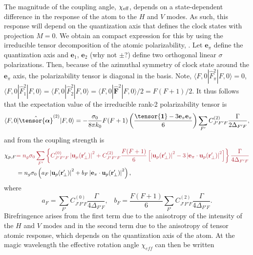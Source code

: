 \documentclass[preprint,aps,pra,onecolumn]{revtex4-1} %
\newcommand{\comment}[1]{{\color{Maroon} #1}}
\begin{document}
The magnitude of the coupling angle, $\chi_{\text{eff}}$, depends on a state-dependent difference in the response of the atom to the $H$ and $V$ modes.  As such, this response will depend on the quantization axis that defines the clock states with projection $M=0$.  We obtain an compact expression for this by using the irreducible tensor decomposition of the atomic polarizability, .  Let $\mathbf{e}_\pi$ define the quantization axis and $\mathbf{e}_{1}$, $\mathbf{e}_{2}$ \comment{(why not $\pm$?)} define two orthogonal linear $\sigma$ polarizations.  Then, because of the azimuthal symmetry of clock state around the $\mathbf{e}_\pi$ axis, the polarizability tensor is diagonal in the basis.  Note, $\langle F,0 | \hat{F}_{\pi}^2| F,0 \rangle =0$, $\langle F,0 | \hat{F}_{1}^2| F,0 \rangle = \langle F,0 | \hat{F}_{2}^2| F,0 \rangle = \langle F,0 | \hat{\mathbf{F}}^2| F,0 \rangle /2 =F(F+1)/2$.  It thus follows that the expectation value of the  irreducible rank-2 polarizability tensor is
\comment{
\begin{equation}
\langle F,0 | \hat{\tensor{\boldsymbol{\alpha}}}^{(2)}| F,0 \rangle  = -\frac{\sigma_0}{8\pi k_0} F(F+1) \left( \frac{\tensor{\boldsymbol{1}} - 3\mathbf{e}_\pi \mathbf{e}_\pi}{6}  \right) \sum_{F'} C^{(2)}_{J'F'F} \frac{\Gamma}{ 2 \Delta_{F'F}},
\end{equation}
}
and from  the coupling strength is
\begin{align}
\chi_{p,F} & \comment{ = n_g \sigma_0 \sum_{F'}  \left\{C^{(0)}_{J'F'F}\left|\mathbf{u}_\mu(\br'_\perp)\right|^2+ C^{(2)}_{J'F'F} \frac{F(F+1)}{6}\left[\left|\mathbf{u}_p(\br'_\perp)\right|^2- 3 \left|\mathbf{e}_\pi \cdot \mathbf{u}_p(\br'_\perp)\right|^2 \right]\right\}   \frac{\Gamma}{4 \Delta_{F'F}} \nonumber } \\
&  = n_g \sigma_0\left(  a_{F} \left|\mathbf{u}_p(\br'_\perp)\right|^2 + b_{F} \left|\mathbf{e}_\pi \cdot \mathbf{u}_p(\br'_\perp)\right|^2 \right),
\end{align}
where
\begin{equation}
a_F = \sum_{F'}  C^{(0)}_{J'F'F} \frac{\Gamma}{4 \Delta_{F'F}},\; \;\; b_F = \frac{F(F+1)}{6}\sum_{F'} C^{(2)}_{J'F'F}  \frac{\Gamma}{4 \Delta_{F'F}}.
\end{equation}
Birefringence arises from the first term due to the anisotropy of the intensity of the $H$ and $V$ modes and in the second term due to the anisotropy of tensor atomic response, which depends on the quantization axis of the atom.  At the magic wavelength the effective rotation angle $\chi_{eff}$ can then be written
\end{document}
